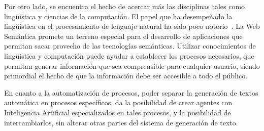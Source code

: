 \documentclass[11pt,a4paper,spanish]{book}
\begin{document}
Por otro lado, se encuentra el hecho de acercar más las disciplinas tales como lingüística y ciencias de la computación. El papel que ha desempeñado la lingüística en el procesamiento de lenguaje natural ha sido poco notorio~\cite{perinan2012defensa}. La Web Semántica promete un terreno especial para el desarrollo de aplicaciones que permitan sacar provecho de las tecnologías semánticas. Utilizar conocimientos de lingüística y computación puede ayudar a establecer los procesos necesarios, que permitan generar información que sea comprensible para cualquier usuario, siendo primordial el hecho de que la información debe ser accesible a todo el público.

En cuanto a la automatización de procesos, poder separar la generación de textos automática en procesos específicos, da la posibilidad de crear agentes con Inteligencia Artificial especializados en tales procesos, y la posibilidad de intercambiarlos, sin alterar otras partes del sistema de generación de texto.















\end{document}
